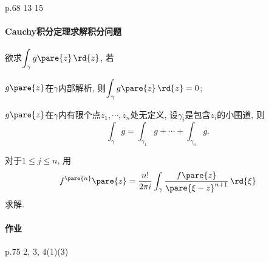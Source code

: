 \documentclass{ctexart}
\begin{document}
p.68 13 15


\paragraph{Cauchy积分定理求解积分问题} %
\label{par:cauchy积分定理求解积分问题}

欲求$\displaystyle \int_\gamma g\pare{z}\,\rd{z}$, 若
\begin{cenum}
    \item $g\pare{z}$在$\gamma$内部解析, 则$\displaystyle \int_\gamma g\pare{z}\,\rd{z} = 0$;
    \item $g\pare{z}$在$\gamma$内有限个点$z_1,\cdots,z_n$处无定义, 设$\gamma_i$是包含$z_i$的小围道, 则
    \[ \int_\gamma g = \int_{\gamma_1} g + \cdots + \int_{\gamma_n} g. \]
    \item 对于$1\le j\le n$, 用
    \[ f^{\pare{n}}\pare{z} = \frac{n!}{2\pi i} \int_\gamma \frac{f\pare{z}}{\pare{\xi - z}^{n+1}}\,\rd{\xi} \]
    求解.
\end{cenum}
\paragraph{作业} %
\label{par:作业}

p.75 2, 3, 4(1)(3)

\end{document}
